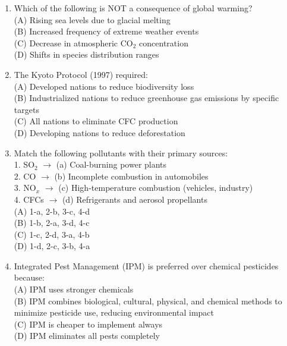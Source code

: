 \documentclass{article}
\begin{document}
\begin{enumerate}[label=Q\arabic*.]
\item Which of the following is NOT a consequence of global warming?
\\(A) Rising sea levels due to glacial melting
\\(B) Increased frequency of extreme weather events
\\(C) Decrease in atmospheric CO$_2$ concentration
\\(D) Shifts in species distribution ranges

\item The Kyoto Protocol (1997) required:
\\(A) Developed nations to reduce biodiversity loss
\\(B) Industrialized nations to reduce greenhouse gas emissions by specific targets
\\(C) All nations to eliminate CFC production
\\(D) Developing nations to reduce deforestation

\item Match the following pollutants with their primary sources:\\
1. SO$_2$ $\rightarrow$ (a) Coal-burning power plants\\
2. CO $\rightarrow$ (b) Incomplete combustion in automobiles\\
3. NO$_x$ $\rightarrow$ (c) High-temperature combustion (vehicles, industry)\\
4. CFCs $\rightarrow$ (d) Refrigerants and aerosol propellants
\\(A) 1-a, 2-b, 3-c, 4-d
\\(B) 1-b, 2-a, 3-d, 4-c
\\(C) 1-c, 2-d, 3-a, 4-b
\\(D) 1-d, 2-c, 3-b, 4-a

\item Integrated Pest Management (IPM) is preferred over chemical pesticides because:
\\(A) IPM uses stronger chemicals
\\(B) IPM combines biological, cultural, physical, and chemical methods to minimize pesticide use, reducing environmental impact
\\(C) IPM is cheaper to implement always
\\(D) IPM eliminates all pests completely

\end{enumerate}
\end{document}
